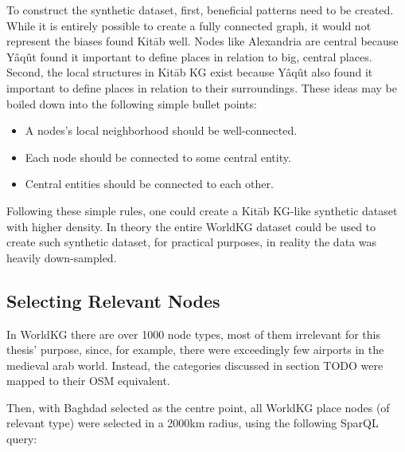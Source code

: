 To construct the synthetic dataset, first, beneficial patterns need to be created.
While it is entirely possible to create a fully connected graph, it would not represent the biases found Kitāb well.
Nodes like Alexandria are central because Yâqût found it important to define places in relation to big, central places.
Second, the local structures in Kitāb KG exist because Yâqût also found it important to define places in relation
to their surroundings.
These ideas may be boiled down into the following simple bullet points:
\begin{itemize}
    \item A nodes's local neighborhood should be well-connected.
    \item Each node should be connected to some central entity.
    \item Central entities should be connected to each other.
\end{itemize}

Following these simple rules, one could create a Kitāb KG-like synthetic dataset with higher density.
In theory the entire WorldKG dataset could be used to create such synthetic dataset, for practical purposes,
in reality the data was heavily down-sampled.

\subsection{Selecting Relevant Nodes}
In WorldKG there are over 1000 node types, most of them irrelevant for this thesis' purpose, since, for example,
there were exceedingly few airports in the medieval arab world.
Instead, the categories discussed in section TODO were mapped to their OSM equivalent.

Then, with Baghdad selected as the centre point, all WorldKG place nodes (of relevant type) were selected in a 2000km
radius, using the following SparQL query:

\begin{verbatim}
\end{verbatim}

